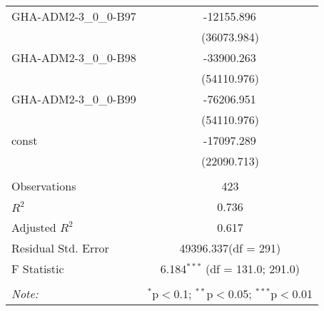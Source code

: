 \begin{table}[!htbp]
\begin{tabular}{@{\extracolsep{5pt}}lc}
 GHA-ADM2-3_0_0-B97 & -12155.896$^{}$ \\
  & (36073.984) \\
 GHA-ADM2-3_0_0-B98 & -33900.263$^{}$ \\
  & (54110.976) \\
 GHA-ADM2-3_0_0-B99 & -76206.951$^{}$ \\
  & (54110.976) \\
 const & -17097.289$^{}$ \\
  & (22090.713) \\
\hline \\[-1.8ex]
 Observations & 423 \\
 $R^2$ & 0.736 \\
 Adjusted $R^2$ & 0.617 \\
 Residual Std. Error & 49396.337(df = 291)  \\
 F Statistic & 6.184$^{***}$ (df = 131.0; 291.0) \\
\hline
\hline \\[-1.8ex]
\textit{Note:} & \multicolumn{1}{r}{$^{*}$p$<$0.1; $^{**}$p$<$0.05; $^{***}$p$<$0.01} \\
\end{tabular}
\end{table}